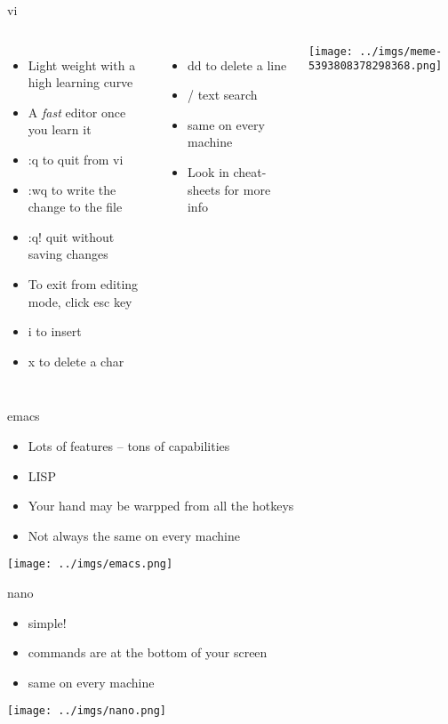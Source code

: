 \documentclass{beamer}
\begin{document}
\begin{frame}{vi}
\begin{columns}
\begin{itemize}
\item Light weight with a high learning curve
\item A \textit{fast} editor once you learn it
\item :q to quit from vi
\item :wq  to write the change to the file
\item :q! quit without saving changes
\item To exit from editing mode, click esc key
\item i to insert
\item x to delete a char
\end{itemize}
\begin{itemize}
\item dd to delete a line
\item / text search
\item same on every machine
\item Look in cheat-sheets for more info
\end{itemize}
\texttt{[image: ../imgs/meme-5393808378298368.png]}
\end{columns}
\end{frame}

\begin{frame}{emacs}
\begin{itemize}
\item Lots of features -- tons of capabilities
\item LISP
\item Your hand may be warpped from all the hotkeys
\item Not always the same on every machine
\end{itemize}
\begin{center}
\texttt{[image: ../imgs/emacs.png]}
\end{center}
\end{frame}

\begin{frame}{nano}
\begin{itemize}
\item simple!
\item commands are at the bottom of your screen
\item same on every machine
\end{itemize}
\texttt{[image: ../imgs/nano.png]}
\end{frame}
\end{document}
